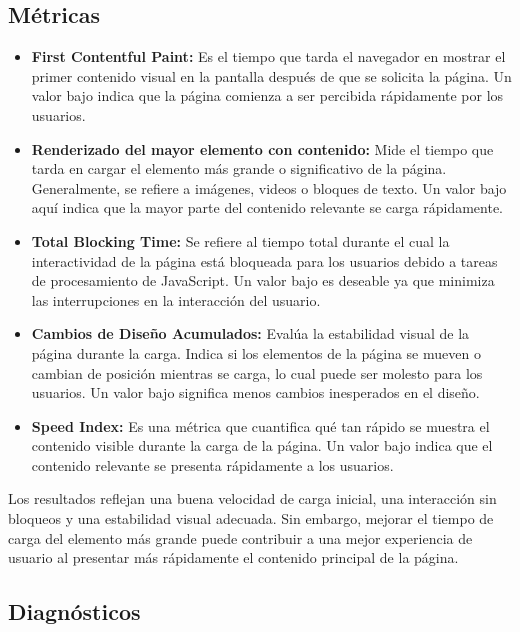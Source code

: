 \documentclass[12pt,a4paper]{article}
\begin{document}
\subsection{Métricas}

\begin{itemize}
  \item \textbf{First Contentful Paint:} Es el tiempo que tarda el navegador en mostrar el primer contenido
        visual en la pantalla después de que se solicita la página. Un valor bajo indica que la página
        comienza a ser percibida rápidamente por los usuarios.
  \item \textbf{Renderizado del mayor elemento con contenido:} Mide el tiempo que tarda en cargar el
        elemento más grande o significativo de la página. Generalmente, se refiere a imágenes,
        videos o bloques de texto. Un valor bajo aquí indica que la mayor parte del contenido
        relevante se carga rápidamente.
  \item \textbf{Total Blocking Time:} Se refiere al tiempo total durante el cual la interactividad de la página
        está bloqueada para los usuarios debido a tareas de procesamiento de JavaScript. Un valor
        bajo es deseable ya que minimiza las interrupciones en la interacción del usuario.
  \item \textbf{Cambios de Diseño Acumulados:} Evalúa la estabilidad visual de la página durante la carga.
        Indica si los elementos de la página se mueven o cambian de posición mientras se carga, lo
        cual puede ser molesto para los usuarios. Un valor bajo significa menos cambios inesperados
        en el diseño.
  \item \textbf{Speed Index:} Es una métrica que cuantifica qué tan rápido se muestra el contenido visible
        durante la carga de la página. Un valor bajo indica que el contenido relevante se presenta
        rápidamente a los usuarios.
\end{itemize}

Los resultados reflejan una buena velocidad de carga inicial, una interacción sin bloqueos y
una estabilidad visual adecuada. Sin embargo, mejorar el tiempo de carga del elemento más
grande puede contribuir a una mejor experiencia de usuario al presentar más rápidamente el
contenido principal de la página.

\subsection{Diagnósticos}
\end{document}
